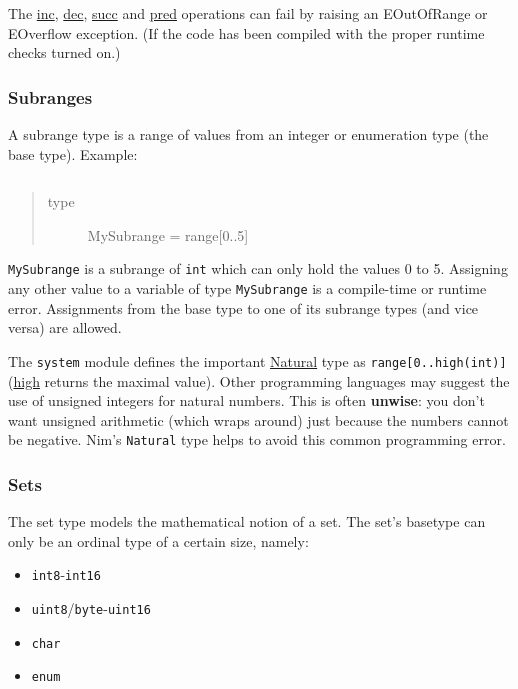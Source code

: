 The \href{system.html\#inc,T,int}{inc},
\href{system.html\#dec,T,int}{dec}, \href{system.html\#succ,T,int}{succ}
and \href{system.html\#pred,T,int}{pred} operations can fail by raising
an {EOutOfRange} or {EOverflow} exception. (If the code has been
compiled with the proper runtime checks turned on.)

\hypertarget{subranges}{%
\subsubsection{Subranges}\label{subranges}}

A subrange type is a range of values from an integer or enumeration type
(the base type). Example:

\begin{verbatim}
\end{verbatim}

\begin{quote}
\begin{description}
\item[type]
MySubrange = range{[}0..5{]}
\end{description}
\end{quote}

\texttt{MySubrange} is a subrange of \texttt{int} which can only hold
the values 0 to 5. Assigning any other value to a variable of type
\texttt{MySubrange} is a compile-time or runtime error. Assignments from
the base type to one of its subrange types (and vice versa) are allowed.

The \texttt{system} module defines the important
\href{system.html\#Natural}{Natural} type as
\texttt{range{[}0..high(int){]}}
(\href{system.html\#high,typedesc\%5BT\%5D}{high} returns the maximal
value). Other programming languages may suggest the use of unsigned
integers for natural numbers. This is often \textbf{unwise}: you don't
want unsigned arithmetic (which wraps around) just because the numbers
cannot be negative. Nim's \texttt{Natural} type helps to avoid this
common programming error.

\hypertarget{sets}{%
\subsubsection{Sets}\label{sets}}

The set type models the mathematical notion of a set. The set's basetype
can only be an ordinal type of a certain size, namely:

\begin{itemize}
\tightlist
\item
  \texttt{int8}-\texttt{int16}
\item
  \texttt{uint8}/\texttt{byte}-\texttt{uint16}
\item
  \texttt{char}
\item
  \texttt{enum}
\end{itemize}

